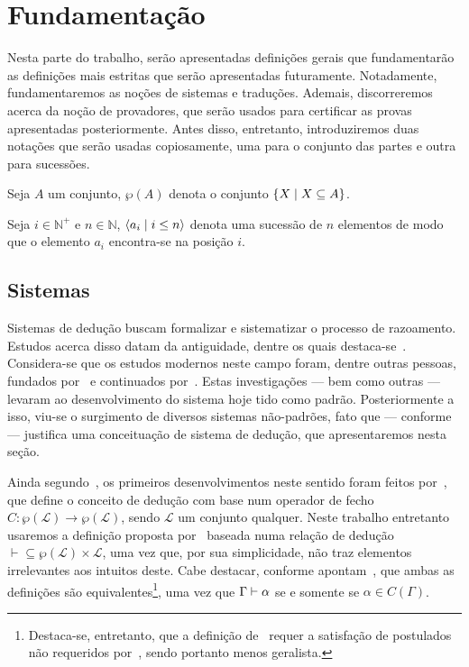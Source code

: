 \chapter{Fundamentação}

Nesta parte do trabalho, serão apresentadas definições gerais que fundamentarão as definições mais estritas que serão apresentadas futuramente. Notadamente, fundamentaremos as noções de sistemas e traduções. Ademais, discorreremos acerca da noção de provadores, que serão usados para certificar as provas apresentadas posteriormente. Antes disso, entretanto, introduziremos duas notações que serão usadas copiosamente, uma para o conjunto das partes e outra para sucessões.

\begin{notation}
    Seja $A$ um conjunto, $\wp(A)$ denota o conjunto $\left\{X\mid X\subseteq A\right\}$.
\end{notation}

\begin{notation}
    Seja $i\in\mathbb{N}^+$ e $n\in\mathbb{N}$, $\langle a_i\mid i\leq n\rangle$ denota uma sucessão de $n$ elementos de modo que o elemento $a_i$ encontra-se na posição $i$.
\end{notation}

\section{Sistemas}

Sistemas de dedução buscam formalizar e sistematizar o processo de razoamento. Estudos acerca disso datam da antiguidade, dentre os quais destaca-se~\cite{Aristotle}. Considera-se que os estudos modernos neste campo foram, dentre outras pessoas, fundados por~\cite{Frege} e continuados por~\cite{Russel-A,Russel-B,Russel-C}. Estas investigações --- bem como outras --- levaram ao desenvolvimento do sistema hoje tido como padrão. Posteriormente a isso, viu-se o surgimento de diversos sistemas não-padrões, fato que --- conforme~\cite{Beziau-B} --- justifica uma conceituação de sistema de dedução, que apresentaremos nesta seção.

Ainda segundo~\cite{Beziau-B}, os primeiros desenvolvimentos neste sentido foram feitos por~\cite{Tarski}, que define o conceito de dedução com base num operador de fecho $C\mathrel{:}\wp(\mathcal{L})\to\wp(\mathcal{L})$, sendo $\mathcal{L}$ um conjunto qualquer. Neste trabalho entretanto usaremos a definição proposta por~\cite{Beziau} baseada numa relação de dedução ${\vdash}\subseteq\wp(\mathcal{L})\times\mathcal{L}$, uma vez que, por sua simplicidade, não traz elementos irrelevantes aos intuitos deste. Cabe destacar, conforme apontam~\cite{Font}, que ambas as definições são equivalentes\footnote{Destaca-se, entretanto, que a definição de~\cite{Tarski} requer a satisfação de postulados não requeridos por~\cite{Beziau}, sendo portanto menos geralista.}, uma vez que $\Gamma\mathrel{\vdash}\alpha$ se e somente se $\alpha\in C(\Gamma)$.

